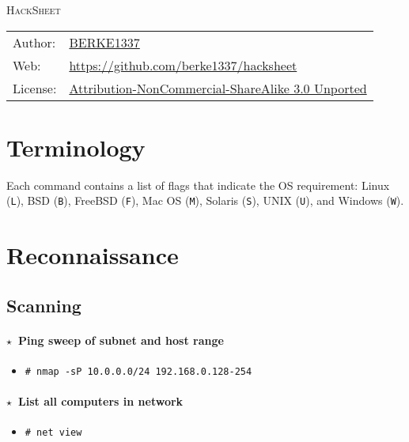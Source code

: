 \documentclass[10pt,landscape]{article}
\newcommand{\os}[1]{\texttt{\footnotesize{#1}}}
\newcommand{\unix}{\os{U}}
\newcommand{\freebsd}{\os{F}}
\newcommand{\bsd}{\os{B}}
\newcommand{\linux}{\os{L}}
\newcommand{\solaris}{\os{S}}
\newcommand{\macos}{\os{M}}
\newcommand{\windows}{\os{W}}
\newenvironment{action}[1]
  {\paragraph{$\star$~#1}\begin{itemize}[leftmargin=1cm]}
  {\end{itemize}}
\newcommand{\cmd}[2]{\item[#1] {\small\tt\# #2}}
\begin{document}
\begin{multicols*}{3}

{\Huge\scshape
HackSheet\hspace{-2pt}\hspace{-4pt}
}


{\scriptsize
{}
\begin{tabular}{l l}
Author: & \href{https://github.com/berke1337}{BERKE1337}\\
Web: & \url{https://github.com/berke1337/hacksheet}\\
License: & \href{http://creativecommons.org/licenses/by-nc-sa/3.0/}
                {Attribution-NonCommercial-ShareAlike 3.0 Unported}
\end{tabular}
}


\vspace{-10pt}

\section*{Terminology}

Each command contains a list of flags that indicate the OS requirement: Linux
(\linux), BSD (\bsd), FreeBSD (\freebsd), Mac OS (\macos), Solaris (\solaris),
UNIX (\unix), and Windows (\windows).

\section*{Reconnaissance}

\subsection*{Scanning}

\begin{action}{Ping sweep of subnet and host range}
\cmd{\unix}{nmap -sP 10.0.0.0/24 192.168.0.128-254}
\end{action}

\begin{action}{List all computers in network}
\cmd{\windows}{net view}
\end{action}


\end{multicols*}
\end{document}
